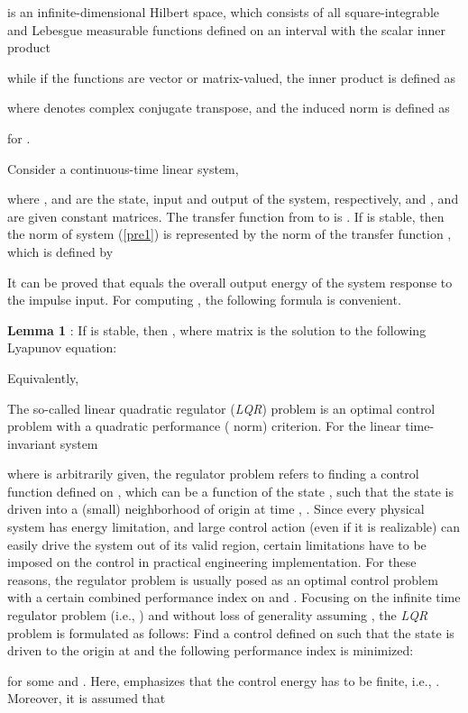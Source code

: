 \documentclass[11pt]{article}
\def\dref#1{(\ref{#1})}
\begin{document}
\quad  is an infinite-dimensional Hilbert space, which
consists of all square-integrable and Lebesgue measurable functions
defined on an interval  with the scalar inner product

while if the functions are vector or matrix-valued, the inner
product is defined as

where  denotes complex conjugate transpose, and the induced
norm is defined as

for .


Consider a continuous-time linear system,

where ,  and  are the state, input and output of the
system, respectively, and ,  and  are given
constant matrices. The transfer function from  to  is
. If  is stable, then the  norm of
system \dref{pre1} is represented by the  norm of the transfer
function , which is defined by

It can be proved that  equals the overall output
energy of the system response to the impulse input. For computing
, the following formula is convenient.


\textbf{Lemma 1} \cite{zhou96}: If  is stable, then
, where matrix  is the
solution to the following Lyapunov equation:

Equivalently,


The so-called linear quadratic regulator (\textit{LQR}) problem is
an optimal control problem with a quadratic performance ( norm)
criterion. For the linear time-invariant system

where  is arbitrarily given, the regulator problem refers to
finding a control function  defined on , which can be
a function of the state , such that the state  is driven
into a (small) neighborhood of origin at time , . Since
every physical system has energy limitation, and large control
action (even if it is realizable) can easily drive the system out of
its valid region, certain limitations have to be imposed on the
control in practical engineering implementation. For these reasons,
the regulator problem is usually posed as an optimal control problem
with a certain combined performance index on  and . Focusing
on the infinite time regulator problem (i.e., )
and without loss of generality assuming , the \textit{LQR}
problem is formulated as follows: Find a control  defined on
 such that the state  is driven to the origin at
 and the following performance index is
minimized:

for some  and . Here,  emphasizes that the
control energy has to be finite, i.e., .
Moreover, it is assumed that
\end{document}
